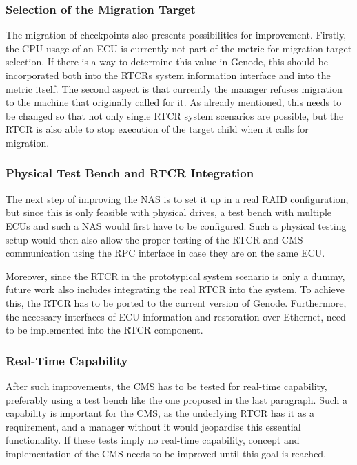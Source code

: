 \subsubsection{Selection of the Migration Target}
The migration of checkpoints also presents possibilities for improvement. Firstly, the CPU usage of an ECU is currently not part of the metric for migration target selection. If there is a way to determine this value in Genode, this should be incorporated both into the RTCRs system information interface and into the metric itself. The second aspect is that currently the manager refuses migration to the machine that originally called for it. As already mentioned, this needs to be changed so that not only single RTCR system scenarios are possible, but the RTCR is also able to stop execution of the target child when it calls for migration.
\subsubsection{Physical Test Bench and RTCR Integration}
The next step of improving the NAS is to set it up in a real RAID configuration, but since this is only feasible with physical drives, a test bench with multiple ECUs and such a NAS would first have to be configured. Such a physical testing setup would then also allow the proper testing of the RTCR and CMS communication using the RPC interface in case they are on the same ECU. 

Moreover, since the RTCR in the prototypical system scenario is only a dummy, future work also includes integrating the real RTCR into the system. To achieve this, the RTCR has to be ported to the current version of Genode. Furthermore, the necessary interfaces of ECU information and restoration over Ethernet, need to be implemented into the RTCR component. 
\subsubsection{Real-Time Capability}
After such improvements, the CMS has to be tested for real-time capability, preferably using a test bench like the one proposed in the last paragraph. Such a capability is important for the CMS, as the underlying RTCR has it as a requirement, and a manager without it would jeopardise this essential functionality. If these tests imply no real-time capability, concept and implementation of the CMS needs to be improved until this goal is reached.

